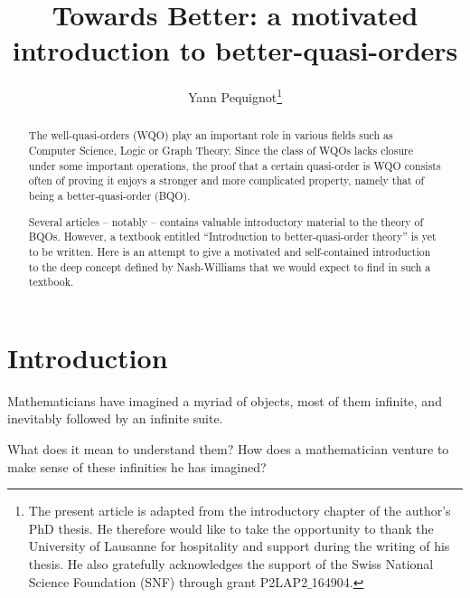 \documentclass{article}%
\title{Towards Better: a motivated introduction to better-quasi-orders}
\author{Yann Pequignot\thanks{The present article is adapted from the introductory chapter of the author's PhD thesis. He therefore would like to take the opportunity to thank the University of Lausanne for hospitality and support during the writing of his thesis. He also gratefully acknowledges the support of the Swiss National Science Foundation (SNF) through grant P2LAP2$\_$164904.}}
\theoremstyle{plain}
\theoremstyle{definition}
\theoremstyle{remark}
\begin{document}

\renewcommand{\setminus}{\smallsetminus}
\renewcommand{\geq}{\geqslant}
\renewcommand{\leq}{\leqslant}
\renewcommand{\ngeq}{\ngeqslant} %
\renewcommand{\nleq}{\nleqslant}








\maketitle


\begin{abstract}
The well-quasi-orders (WQO) play an important role in various fields such as Computer Science, Logic or Graph Theory. Since the class of WQOs lacks closure under some important operations, the proof that a certain quasi-order is WQO consists often of proving it enjoys a stronger and more complicated property, namely that of being a better-quasi-order (BQO). 

Several articles -- notably \cite{milner1985basic,kruskal1972theory,simpson1985bqo,laverfraisse,laver1976well,forster2003better} -- contains valuable introductory material to the theory of BQOs. However, a textbook entitled \enquote{Introduction to better-quasi-order theory} is yet to be written. Here is an attempt to give a motivated and self-contained introduction to the deep concept defined by Nash-Williams that we would expect to find in such a textbook.
\end{abstract}


%




\section{Introduction}
Mathematicians have imagined a myriad of objects, most of them infinite, and inevitably followed by an infinite suite. 

What does it mean to understand them? 
How does a mathematician venture to make sense of these infinities he has imagined? 
\end{document}
